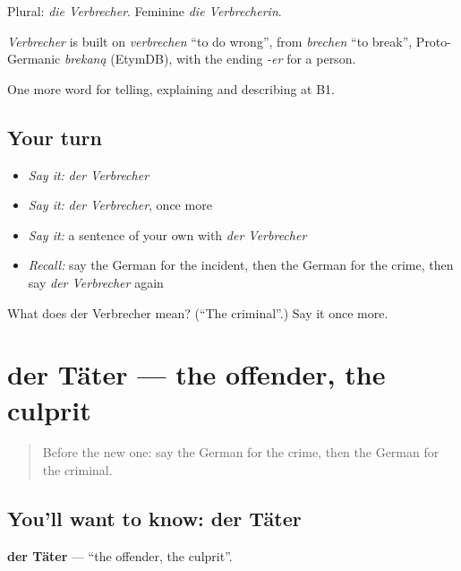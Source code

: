 Plural: \emph{die Verbrecher}. Feminine \emph{die Verbrecherin}.

\begin{cousinweb}
\emph{Verbrecher} is built on \emph{verbrechen} \textquotedblleft{}to do wrong\textquotedblright{}, from \emph{brechen} \textquotedblleft{}to break\textquotedblright{}, Proto-Germanic \emph{brekaną} (EtymDB), with the ending \emph{-er} for a person.
\end{cousinweb}

\begin{grammarlens}[title={What you've built}]
One more word for telling, explaining and describing at B1.
\end{grammarlens}

\subsection*{Your turn}
\begin{itemize}
\raggedright
  \item \emph{Say it:} \emph{der Verbrecher}
  \item \emph{Say it:} \emph{der Verbrecher}, once more
  \item \emph{Say it:} a sentence of your own with \emph{der Verbrecher}
  \item \emph{Recall:} say the German for the incident, then the German for the crime, then say \emph{der Verbrecher} again
\end{itemize}

\begin{tcolorbox}[breakable,colback=teal!4,colframe=teal!35!black,title={Before you move on}]
What does der Verbrecher mean? (\textquotedblleft{}The criminal\textquotedblright{}.) Say it once more.
\end{tcolorbox}
\section[der Täter]{der Täter — the offender, the culprit}

\label{lesson:GE-C280-taeter}



\begin{quote}
Before the new one: say the German for the crime, then the German for the criminal.
\end{quote}

\subsection*{You'll want to know: der Täter}
\textbf{der Täter} — \textquotedblleft{}the offender, the culprit\textquotedblright{}.

